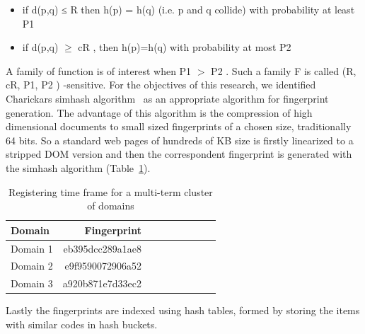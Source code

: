 \documentclass{easychair}
\begin{document}
  \begin{itemize}
  \item if d(p,q) ≤ R then h(p) = h(q) (i.e. p and q collide)  with probability at least P1
  \item if d(p,q) \begin{math} \geq \end{math} cR , then h(p)=h(q) with probability at most P2
  \end{itemize}

    
A family of function is of interest when P1 \begin{math} > \end{math} P2 . Such a family F is called (R, cR, P1, P2 ) -sensitive. For the objectives of this research, we identified Charickar\textquotesingle s simhash algorithm~\cite{Charikar:2002:SET:509907.509965}
 as an appropriate algorithm for fingerprint generation. The advantage of this algorithm is the compression of high dimensional documents to small sized fingerprints of a chosen size, traditionally 64 bits. So a standard web pages of hundreds of KB size is firstly linearized to a stripped DOM version and then the correspondent fingerprint is generated with the simhash algorithm (Table~\ref{tab:table1}). 



\begin{table}[htp]
  \begin{centering}
    \begin{tabular}{lrrrrrrrr}
    \hline
    Domain            & Fingerprint  \\
                          
    \hline
    Domain 1 &  eb395dcc289a1ae8   \\
    \hline
    Domain 2      &  e9f9590072906a52   \\
	
    \hline
    Domain 3      &  a920b871e7d33ec2   \\
    
    \hline
    \end{tabular}
    \caption{Registering time frame for a multi-term cluster of domains }
    \label{tab:table1}
  \end{centering}
\end{table}

Lastly the fingerprints are indexed using hash tables, formed by storing the items with similar codes in hash buckets.


\end{document}

